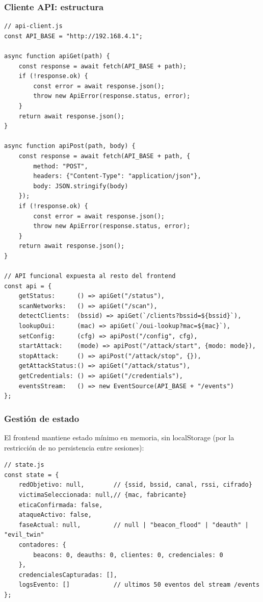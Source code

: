 \documentclass[11pt,a4paper]{article}
\begin{document}
\subsubsection{Cliente API: estructura}

\begin{lstlisting}
// api-client.js
const API_BASE = "http://192.168.4.1";

async function apiGet(path) {
    const response = await fetch(API_BASE + path);
    if (!response.ok) {
        const error = await response.json();
        throw new ApiError(response.status, error);
    }
    return await response.json();
}

async function apiPost(path, body) {
    const response = await fetch(API_BASE + path, {
        method: "POST",
        headers: {"Content-Type": "application/json"},
        body: JSON.stringify(body)
    });
    if (!response.ok) {
        const error = await response.json();
        throw new ApiError(response.status, error);
    }
    return await response.json();
}

// API funcional expuesta al resto del frontend
const api = {
    getStatus:      () => apiGet("/status"),
    scanNetworks:   () => apiGet("/scan"),
    detectClients:  (bssid) => apiGet(`/clients?bssid=${bssid}`),
    lookupOui:      (mac) => apiGet(`/oui-lookup?mac=${mac}`),
    setConfig:      (cfg) => apiPost("/config", cfg),
    startAttack:    (mode) => apiPost("/attack/start", {modo: mode}),
    stopAttack:     () => apiPost("/attack/stop", {}),
    getAttackStatus:() => apiGet("/attack/status"),
    getCredentials: () => apiGet("/credentials"),
    eventsStream:   () => new EventSource(API_BASE + "/events")
};
\end{lstlisting}

\subsubsection{Gestión de estado}

El frontend mantiene estado mínimo en memoria, sin localStorage (por la
restricción de no persistencia entre sesiones):

\begin{lstlisting}
// state.js
const state = {
    redObjetivo: null,        // {ssid, bssid, canal, rssi, cifrado}
    victimaSeleccionada: null,// {mac, fabricante}
    eticaConfirmada: false,
    ataqueActivo: false,
    faseActual: null,         // null | "beacon_flood" | "deauth" | "evil_twin"
    contadores: {
        beacons: 0, deauths: 0, clientes: 0, credenciales: 0
    },
    credencialesCapturadas: [],
    logsEvento: []            // ultimos 50 eventos del stream /events
};
\end{lstlisting}
\end{document}
